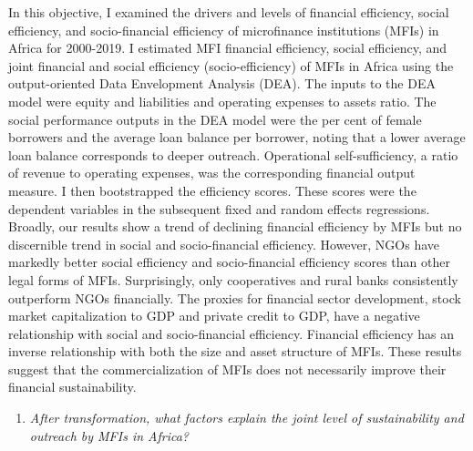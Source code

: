 \documentclass[a4paper, nobind]{templates/ociamthesis}
\providecommand{\tightlist}{%
  \setlength{\itemsep}{0pt}\setlength{\parskip}{0pt}}
\begin{document}
In this objective, I examined the drivers and levels of financial efficiency, social efficiency, and socio-financial efficiency of microfinance institutions (MFIs) in Africa for 2000-2019. I estimated MFI financial efficiency, social efficiency, and joint financial and social efficiency (socio-efficiency) of MFIs in Africa using the output-oriented Data Envelopment Analysis (DEA). The inputs to the DEA model were equity and liabilities and operating expenses to assets ratio. The social performance outputs in the DEA model were the per cent of female borrowers and the average loan balance per borrower, noting that a lower average loan balance corresponds to deeper outreach. Operational self-sufficiency, a ratio of revenue to operating expenses, was the corresponding financial output measure. I then bootstrapped the efficiency scores. These scores were the dependent variables in the subsequent fixed and random effects regressions. Broadly, our results show a trend of declining financial efficiency by MFIs but no discernible trend in social and socio-financial efficiency. However, NGOs have markedly better social efficiency and socio-financial efficiency scores than other legal forms of MFIs. Surprisingly, only cooperatives and rural banks consistently outperform NGOs financially. The proxies for financial sector development, stock market capitalization to GDP and private credit to GDP, have a negative relationship with social and socio-financial efficiency. Financial efficiency has an inverse relationship with both the size and asset structure of MFIs. These results suggest that the commercialization of MFIs does not necessarily improve their financial sustainability.

\begin{enumerate}
\def\labelenumi{\arabic{enumi}.}
\setcounter{enumi}{3}
\tightlist
\item
  \emph{After transformation, what factors explain the joint level of sustainability and outreach by MFIs in Africa?}
\end{enumerate}
\end{document}
